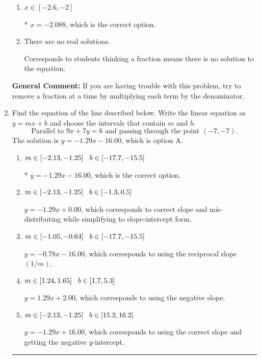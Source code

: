 \documentclass{extbook}[14pt]
\newcommand{\litem}[1]{\item #1

\rule{\textwidth}{0.4pt}}
\begin{document}
\begin{enumerate}
{\begin{enumerate}[label=\Alph*.]
 $x = -0.887$, which corresponds to dividing the second number in the numerator by the denominator rather than dividing BOTH parts of the numerator by the denominator (or removing the fractions through multiplication).
\item \( x \in [-2.6, -2] \)

* $x = -2.088$, which is the correct option.
\item \( \text{There are no real solutions.} \)

Corresponds to students thinking a fraction means there is no solution to the equation.
\end{enumerate}

\textbf{General Comment:} If you are having trouble with this problem, try to remove a fraction at a time by multiplying each term by the denominator.
}
\litem{
Find the equation of the line described below. Write the linear equation as $ y=mx+b $ and choose the intervals that contain $m$ and $b$.
\[ \text{Parallel to } 9 x + 7 y = 6 \text{ and passing through the point } (-7, -7). \]The solution is \( y = -1.29x - 16.00 \), which is option A.\begin{enumerate}[label=\Alph*.]
\item \( m \in [-2.13, -1.25] \hspace*{3mm} b \in [-17.7, -15.5] \)

* $y = -1.29x - 16.00$, which is the correct option.
\item \( m \in [-2.13, -1.25] \hspace*{3mm} b \in [-1.3, 0.5] \)

 $y = -1.29x + 0.00$, which corresponds to correct slope and mis-distributing while simplifying to slope-intercept form.
\item \( m \in [-1.05, -0.64] \hspace*{3mm} b \in [-17.7, -15.5] \)

 $y = -0.78x - 16.00$, which corresponds to using the reciprocal slope $(1/m)$.
\item \( m \in [1.24, 1.65] \hspace*{3mm} b \in [1.7, 5.3] \)

 $y = 1.29x + 2.00$, which corresponds to using the negative slope.
\item \( m \in [-2.13, -1.25] \hspace*{3mm} b \in [15.2, 16.2] \)

 $y = -1.29x + 16.00$, which corresponds to using the correct slope and getting the negative $y$-intercept.
\end{enumerate}

}
\end{enumerate}
\end{document}
